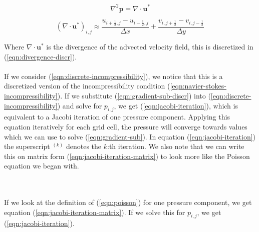 \documentclass[twocolumn]{article}
\begin{document}

\begin{equation}
  \nabla^2 \mathbf{p} = \nabla \cdot \mathbf{u}^*
\label{eqn:poisson}
\end{equation}

\begin{equation}
  (\nabla \cdot \mathbf{u}^*)_{i, j} \approx
    \frac{u_{i+\frac{1}{2}, j} - u_{i-\frac{1}{2}, j}}{\Delta x} +
    \frac{v_{i, j+\frac{1}{2}} - v_{i, j-\frac{1}{2}}}{\Delta y}
\label{eqn:divergence-discr}
\end{equation}

Where $\nabla \cdot \mathbf{u}^*$ is the divergence of the advected velocity field, this is discretized in (\ref{eqn:divergence-discr}).
\\\\
If we consider (\ref{eqn:discrete-incompressibility}), we notice that this is a discretized version of the incompressibility condition (\ref{eqn:navier-stokes-incompressibility}). If we substitute (\ref{eqn:gradient-sub-discr}) into (\ref{eqn:discrete-incompressibility}) and solve for $p_{i, j}$, we get (\ref{eqn:jacobi-iteration}), which is equivalent to a Jacobi iteration of one pressure component. Applying this equation iteratively for each grid cell, the pressure will converge towards values which we can use to solve (\ref{eqn:gradient-sub}). In equation (\ref{eqn:jacobi-iteration}) the superscript $^{(k)}$ denotes the $k$:th iteration. We also note that we can write this on matrix form (\ref{eqn:jacobi-iteration-matrix}) to look more like the Poisson equation we began with.

\\\\
If we look at the definition of (\ref{eqn:poisson}) for one pressure component, we get equation (\ref{eqn:jacobi-iteration-matrix}). If we solve this for $p_{i, j}$, we get (\ref{eqn:jacobi-iteration}).
\fi
\end{document}
